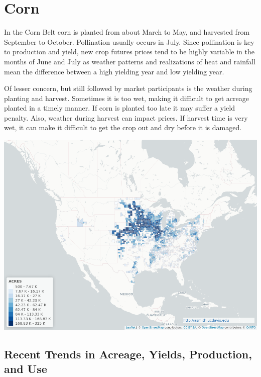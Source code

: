\documentclass[
]{book}
\begin{document}
\hypertarget{corn}{%
\section{Corn}\label{corn}}

In the Corn Belt corn is planted from about March to May, and harvested from September to October. Pollination usually occurs in July. Since pollination is key to production and yield, new crop futures prices tend to be highly variable in the months of June and July as weather patterns and realizations of heat and rainfall mean the difference between a high yielding year and low yielding year.

Of lesser concern, but still followed by market participants is the weather during planting and harvest. Sometimes it is too wet, making it difficult to get acreage planted in a timely manner. If corn is planted too late it may suffer a yield penalty. Also, weather during harvest can impact prices. If harvest time is very wet, it can make it difficult to get the crop out and dry before it is damaged.

\href{https://asmith.ucdavis.edu/data/us-crops}{\includegraphics{assets/map_CORN_AREA PLANTED.png}}

\hypertarget{recent-trends-in-acreage-yields-production-and-use}{%
\subsection{Recent Trends in Acreage, Yields, Production, and Use}\label{recent-trends-in-acreage-yields-production-and-use}}
\end{document}

